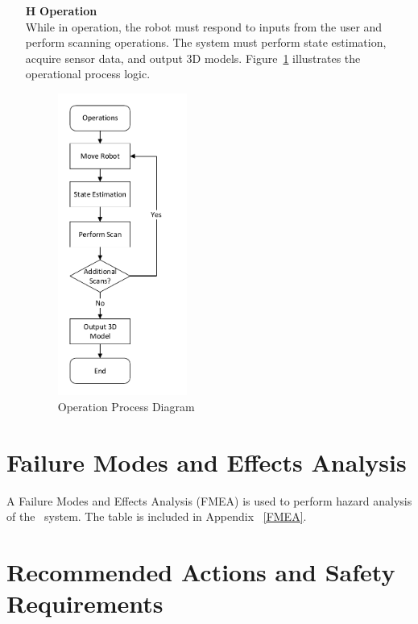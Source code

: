 \documentclass[12pt]{article}
\newcounter{haznum} %
\begin{document}
\begin{itemize}
\item[\textbf{H\refstepcounter{haznum}\thehaznum \label{H2}}] \textbf{Operation}\\
While in operation, the robot must respond to inputs from the user and perform scanning operations. The system must perform state estimation, acquire sensor data, and output 3D models. Figure~\ref{fig_Operation} illustrates the operational process logic.
\begin{figure}[H]
\centering
\includegraphics[width = 0.4\textwidth]{Figures/Operation Processes.pdf}
\caption{Operation Process Diagram}
\label{fig_Operation}
\end{figure}
\end{itemize}

\section{Failure Modes and Effects Analysis}

A Failure Modes and Effects Analysis (FMEA) is used to perform hazard analysis of the \progname ~system. The table is included in Appendix ~\ref{FMEA}.

\section{Recommended Actions and Safety Requirements}
\end{document}
